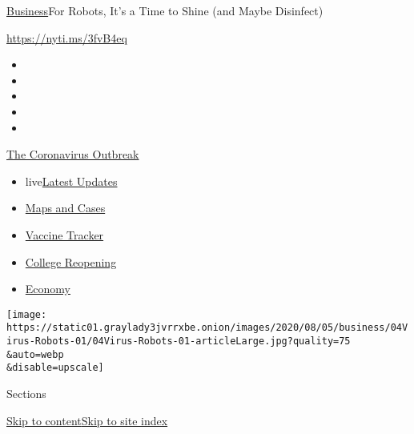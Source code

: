 \href{/section/business}{Business}\textbar{}For Robots, It's a Time to
Shine (and Maybe Disinfect)

\href{https://nyti.ms/3fvB4eq}{https://nyti.ms/3fvB4eq}

\begin{itemize}
\item
\item
\item
\item
\item
\end{itemize}

\href{https://www.nytimes3xbfgragh.onion/news-event/coronavirus?action=click\&pgtype=Article\&state=default\&region=TOP_BANNER\&context=storylines_menu}{The
Coronavirus Outbreak}

\begin{itemize}
\tightlist
\item
  live\href{https://www.nytimes3xbfgragh.onion/2020/08/04/world/coronavirus-cases.html?action=click\&pgtype=Article\&state=default\&region=TOP_BANNER\&context=storylines_menu}{Latest
  Updates}
\item
  \href{https://www.nytimes3xbfgragh.onion/interactive/2020/us/coronavirus-us-cases.html?action=click\&pgtype=Article\&state=default\&region=TOP_BANNER\&context=storylines_menu}{Maps
  and Cases}
\item
  \href{https://www.nytimes3xbfgragh.onion/interactive/2020/science/coronavirus-vaccine-tracker.html?action=click\&pgtype=Article\&state=default\&region=TOP_BANNER\&context=storylines_menu}{Vaccine
  Tracker}
\item
  \href{https://www.nytimes3xbfgragh.onion/2020/08/02/us/covid-college-reopening.html?action=click\&pgtype=Article\&state=default\&region=TOP_BANNER\&context=storylines_menu}{College
  Reopening}
\item
  \href{https://www.nytimes3xbfgragh.onion/live/2020/08/04/business/stock-market-today-coronavirus?action=click\&pgtype=Article\&state=default\&region=TOP_BANNER\&context=storylines_menu}{Economy}
\end{itemize}

\texttt{[image: https://static01.graylady3jvrrxbe.onion/images/2020/08/05/business/04Virus-Robots-01/04Virus-Robots-01-articleLarge.jpg?quality=75\\\&auto=webp\\\&disable=upscale]}

Sections

\protect\hyperlink{site-content}{Skip to
content}\protect\hyperlink{site-index}{Skip to site index}

